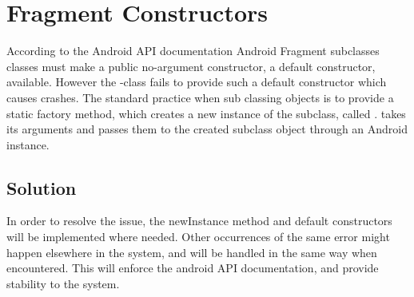 
\section{Fragment Constructors}
\label{sec:fragment_constructors}

According to the Android API documentation \parencite{android_dev_fragment} Android Fragment subclasses classes must make a public no-argument constructor, a default constructor, available. However the \giraf-class  fails to provide such a default constructor which causes crashes. The standard practice when sub classing  objects is to provide a static factory method, which creates a new instance of the  subclass, called .  takes its arguments and passes them to the created  subclass object through an Android  instance. 

\subsection{Solution} 
\label{sub:fragment_constructors_solution}
In order to resolve the issue, the newInstance method and default constructors will be implemented where needed. Other occurrences of the same error might happen elsewhere in the system, and will be handled in the same way when encountered. This will enforce the android API documentation, and provide stability to the system. 